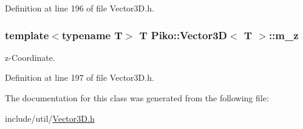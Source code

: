 Definition at line 196 of file Vector3\-D.\-h.

\hypertarget{class_piko_1_1_vector3_d_ad5884867c154d7b0ad4eaa015fbedc4e}{
\subsubsection[{m\-\_\-z}]{\setlength{\rightskip}{0pt plus 5cm}template$<$typename T$>$ T {\bf Piko\-::\-Vector3\-D}$<$ T $>$\-::m\-\_\-z\hspace{0.3cm}{\ttfamily [private]}}}\label{d1/db7/class_piko_1_1_vector3_d_ad5884867c154d7b0ad4eaa015fbedc4e}
z-\/\-Coordinate. 

Definition at line 197 of file Vector3\-D.\-h.



The documentation for this class was generated from the following file\-:\begin{DoxyCompactItemize}
\item 
include/util/\hyperlink{_vector3_d_8h}{Vector3\-D.\-h}\end{DoxyCompactItemize}

